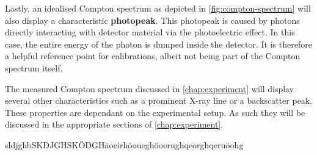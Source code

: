Lastly, an idealised Compton spectrum as depicted in \autoref{fig:compton-spectrum}
will also display a characteristic \textbf{photopeak}. This photopeak is caused by
photons directly interacting with detector material via the photoelectric effect.
In this case, the entire energy of the photon is dumped inside the detector. It is
therefore a helpful reference point for calibrations, albeit not being part of the
Compton spectrum itself.

The measured Compton spectrum discussed in \autoref{chap:experiment} will display
several other characteristics such as a prominent X-ray line or a backscatter peak.
These properties are dependant on the experimental setup. As such they will be
discussed in the appropriate sections of \autoref{chap:experiment}.

sldjghbSKDJGHSKÖDGHäoeirhöoueghöoerughqeorghqeruöohg

